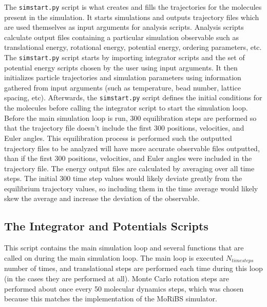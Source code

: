 \documentclass[11pt]{article}
\begin{document}
The \texttt{simstart.py} script is what creates and fills the trajectories for the molecules present in the simulation. It starts simulations and outputs trajectory files which are used themselves as input arguments for analysis scripts. Analysis scripts calculate output files containing a particular simulation observable such as translational energy, rotational energy, potential energy, ordering parameters, etc. The \texttt{simstart.py} script starts by importing integrator scripts and the set of potential energy scripts chosen by the user using input arguments. It then initializes particle trajectories and simulation parameters using information gathered from input arguments (such as temperature, bead number, lattice spacing, etc). Afterwards, the \texttt{simstart.py} script defines the initial conditions for the molecules before calling the  integrator script to start the simulation loop. Before the main simulation loop is run, 300 equilibration steps are performed so that the trajectory file doesn't include the first 300 positions, velocities, and Euler angles. This equilibration process is performed such the outputted trajectory files to be analyzed will have more accurate observable files outputted, than if the first 300 positions, velocities, and Euler angles were included in the trajectory file. The energy output files are calculated by averaging over all time steps. The initial 300 time step values would likely deviate greatly from the equilibrium trajectory values, so including them in the time average would likely skew the average and increase the deviation of the observable. 

\subsection{The Integrator and Potentials Scripts}

This script contains the main simulation loop and several functions that are called on during the main simulation loop. The main loop is executed \begin{math} N_{timesteps} \end{math} number of times, and translational steps are performed each time during this loop (in the cases they are performed at all). Monte Carlo rotation steps are performed about once every 50 molecular dynamics steps, which was chosen because this matches the implementation of the MoRiBS simulator. 
\end{document}

